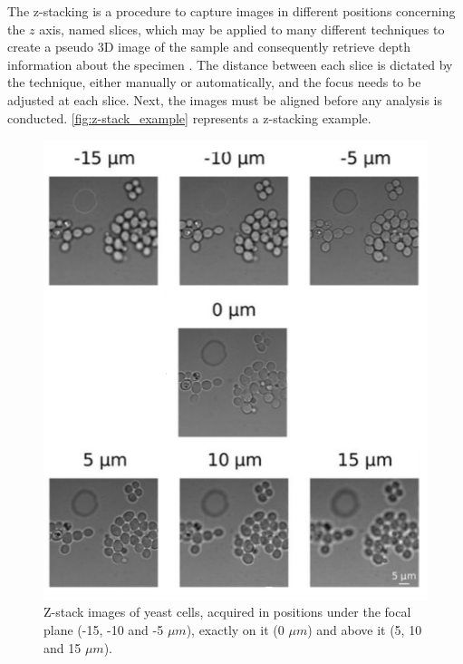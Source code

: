 The z-stacking is a procedure to capture images in different positions concerning the $z$ axis, named slices, which may be applied to many different techniques to create a pseudo 3D image of the sample and consequently retrieve depth information about the specimen \cite{lawlor2019introduction}. The distance between each slice is dictated by the technique, either manually or automatically, and the focus needs to be adjusted at each slice. Next, the images must be aligned before any analysis is conducted. \autoref{fig:z-stack_example} represents a z-stacking example.

\begin{figure}[H]
	\centering
	\caption{\label{fig:z-stack_example} Z-stack images of yeast cells, acquired in positions under the focal plane (-15, -10 and -5 $\mu m$), exactly on it (0 $\mu m$) and above it (5, 10 and 15 $\mu m$).}
	\begin{center}
	    \includegraphics[scale=0.5]{images/z-stack.png}
	\end{center}
	\centering
\end{figure}